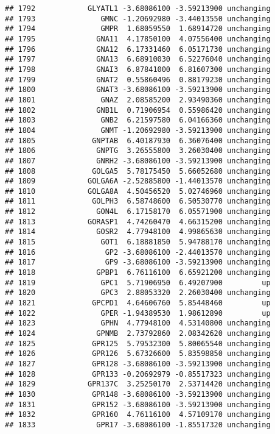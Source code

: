 \documentclass[]{article}
\begin{document}
\begin{verbatim}
## 1792            GLYATL1 -3.68086100 -3.59213900 unchanging
## 1793               GMNC -1.20692980 -3.44013550 unchanging
## 1794               GMPR  1.68059550  1.68914720 unchanging
## 1795              GNA11  4.17850100  4.07556400 unchanging
## 1796              GNA12  6.17331460  6.05171730 unchanging
## 1797              GNA13  6.68910030  6.52276040 unchanging
## 1798              GNAI3  6.87841000  6.81607300 unchanging
## 1799              GNAT2  0.55860496  0.88179230 unchanging
## 1800              GNAT3 -3.68086100 -3.59213900 unchanging
## 1801               GNAZ  2.08585200  2.93490360 unchanging
## 1802              GNB1L  0.71906954  0.55986420 unchanging
## 1803               GNB2  6.21597580  6.04166360 unchanging
## 1804               GNMT -1.20692980 -3.59213900 unchanging
## 1805             GNPTAB  6.40187930  6.36076400 unchanging
## 1806              GNPTG  3.26555800  3.26030400 unchanging
## 1807              GNRH2 -3.68086100 -3.59213900 unchanging
## 1808             GOLGA5  5.78175450  5.66052680 unchanging
## 1809            GOLGA6A -2.52885800 -1.44013570 unchanging
## 1810            GOLGA8A  4.50456520  5.02746960 unchanging
## 1811             GOLPH3  6.58748600  6.50530770 unchanging
## 1812              GON4L  6.17158170  6.05571900 unchanging
## 1813            GORASP1  4.74260470  4.66315200 unchanging
## 1814              GOSR2  4.77948100  4.99865630 unchanging
## 1815               GOT1  6.18881850  5.94788170 unchanging
## 1816                GP2 -3.68086100 -2.44013570 unchanging
## 1817                GP9 -3.68086100 -3.59213900 unchanging
## 1818              GPBP1  6.76116100  6.65921200 unchanging
## 1819               GPC1  5.71906950  6.49207900         up
## 1820               GPC3  2.88053320  2.26030400 unchanging
## 1821             GPCPD1  4.64606760  5.85448460         up
## 1822               GPER -1.94389530  1.98612890         up
## 1823               GPHN  4.77948100  4.53140800 unchanging
## 1824              GPNMB  2.73792860  2.08342620 unchanging
## 1825             GPR125  5.79532300  5.80065540 unchanging
## 1826             GPR126  5.67326600  5.83598850 unchanging
## 1827             GPR128 -3.68086100 -3.59213900 unchanging
## 1828             GPR133 -0.20692979 -0.85517323 unchanging
## 1829            GPR137C  3.25250170  2.53714420 unchanging
## 1830             GPR148 -3.68086100 -3.59213900 unchanging
## 1831             GPR152 -3.68086100 -3.59213900 unchanging
## 1832             GPR160  4.76116100  4.57109170 unchanging
## 1833              GPR17 -3.68086100 -1.85517320 unchanging

\end{verbatim}
\end{document}
